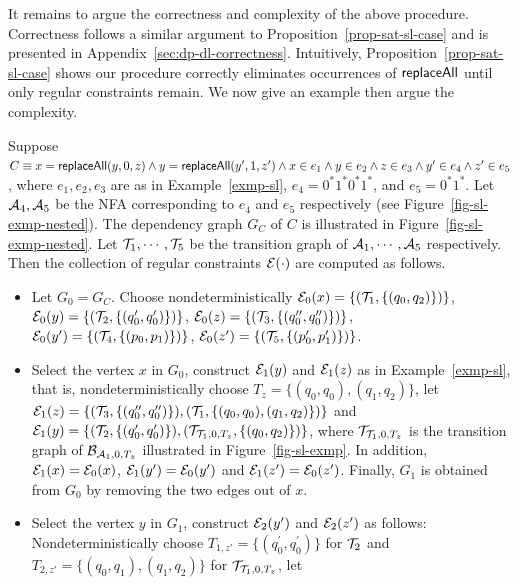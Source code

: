 It remains to argue the correctness and complexity of the above procedure.
Correctness follows a similar argument to Proposition~\ref{prop-sat-sl-case} and is presented in Appendix~\ref{sec:dp-dl-correctness}.
Intuitively, Proposition~\ref{prop-sat-sl-case} shows our procedure correctly eliminates occurrences of $\mathsf{replaceAll}$ until only regular constraints remain.
We now give an example then argue the complexity.

\begin{example}
Suppose $C \equiv x= \mathsf{replaceAll}(y, 0, z) \wedge y = \mathsf{replaceAll}(y', 1, z') \wedge x \in e_1 \wedge y \in e_2 \wedge z \in e_3 \wedge y' \in e_4  \wedge z' \in e_5$, where $e_1, e_2, e_3$ are as in Example~\ref{exmp-sl}, $e_4=0^* 1^* 0^* 1^*$, and $e_5=0^*1^*$. Let $\mathcal{A}_4,\mathcal{A}_5$ be the NFA corresponding to $e_4$ and $e_5$ respectively (see Figure~\ref{fig-sl-exmp-nested}). The dependency graph $G_C$ of $C$ is illustrated in Figure~\ref{fig-sl-exmp-nested}. Let $\mathcal{T}_1,\cdots, \mathcal{T}_5$ be the transition graph of $\mathcal{A}_1,\cdots, \mathcal{A}_5$ respectively. Then the collection of regular constraints $\mathcal{E}(\cdot)$ are computed as follows.
\begin{itemize}
\item Let $G_0=G_C$. Choose nondeterministically $\mathcal{E}_0(x) = \{(\mathcal{T}_1, \{(q_0, q_2)\})\}$, $\mathcal{E}_0(y) = \{(\mathcal{T}_2, \{(q^\prime_0, q^\prime_0)\})\}$, $\mathcal{E}_0(z) = \{(\mathcal{T}_3, \{(q^{\prime\prime}_0, q^{\prime\prime}_0)\})\}$, $\mathcal{E}_0(y^\prime) = \{(\mathcal{T}_4, \{(p_0, p_1)\})\}$, $\mathcal{E}_0(z^\prime) = \{(\mathcal{T}_5, \{(p^{\prime}_0, p^{\prime}_1)\})\}$.
%
\item Select the vertex $x$ in $G_0$, construct $\mathcal{E}_1(y)$ and $\mathcal{E}_1(z)$ as in Example~\ref{exmp-sl}, that is, nondeterministically choose $T_z =\{(q_0, q_0), (q_1,q_2)\}$, let $\mathcal{E}_1(z) = \{(\mathcal{T}_3, \{(q^{\prime\prime}_0, q^{\prime\prime}_0)\}), (\mathcal{T}_1, \{(q_0,q_0), (q_1, q_2)\})\}$ and $\mathcal{E}_1(y)=\{(\mathcal{T}_2, \{(q^\prime_0, q^\prime_0)\}), (\mathcal{T}_{\mathcal{T}_1, 0, T_z}, \{(q_0,q_2)\})\}$, where $\mathcal{T}_{\mathcal{T}_1, 0, T_z}$ is the transition graph of $\mathcal{B}_{\mathcal{A}_1, 0, T_z}$ illustrated in Figure~\ref{fig-sl-exmp}. In addition, $\mathcal{E}_1(x)=\mathcal{E}_0(x)$, $\mathcal{E}_1(y')=\mathcal{E}_0(y')$ and $\mathcal{E}_1(z')=\mathcal{E}_0(z')$. Finally, $G_1$ is obtained from $G_0$ by removing the two edges out of $x$.
%
\item Select the vertex $y$ in $G_1$, construct $\mathcal{E}_2(y')$ and $\mathcal{E}_2(z')$ as follows: Nondeterministically choose $T_{1,z'} = \{(q^\prime_0, q^\prime_0)\}$  for $\mathcal{T}_2$ and $T_{2,z'}=\{(q_0,q_1),(q_1,q_2)\}$ for $\mathcal{T}_{\mathcal{T}_1, 0, T_z}$, let

\end{itemize}
\end{example}
